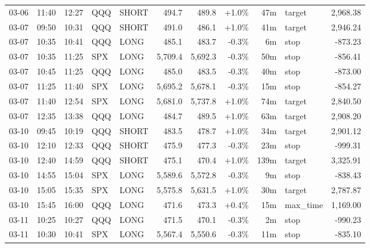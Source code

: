 \documentclass[11pt,a4paper,twoside]{article}
\begin{document}
\begin{center}
\begin{longtable}{>{\color{txtmain}}l l l l l r r r r >{\color{txtmain}}l r}
03-06 & 11:40 & 12:27 & QQQ & SHORT & 494.7 & 489.8 & \textcolor{wingreen}{+1.0\%} & 47m & target & \textcolor{wingreen}{2,968.38} \\
03-07 & 09:50 & 10:31 & QQQ & SHORT & 491.0 & 486.1 & \textcolor{wingreen}{+1.0\%} & 41m & target & \textcolor{wingreen}{2,946.24} \\
03-07 & 10:35 & 10:41 & QQQ & LONG & 485.1 & 483.7 & \textcolor{lossred}{-0.3\%} & 6m & stop & \textcolor{lossred}{-873.23} \\
03-07 & 10:35 & 11:25 & SPX & LONG & 5,709.4 & 5,692.3 & \textcolor{lossred}{-0.3\%} & 50m & stop & \textcolor{lossred}{-856.41} \\
03-07 & 10:45 & 11:25 & QQQ & LONG & 485.0 & 483.5 & \textcolor{lossred}{-0.3\%} & 40m & stop & \textcolor{lossred}{-873.00} \\
03-07 & 11:25 & 11:40 & SPX & LONG & 5,695.2 & 5,678.1 & \textcolor{lossred}{-0.3\%} & 15m & stop & \textcolor{lossred}{-854.27} \\
03-07 & 11:40 & 12:54 & SPX & LONG & 5,681.0 & 5,737.8 & \textcolor{wingreen}{+1.0\%} & 74m & target & \textcolor{wingreen}{2,840.50} \\
03-07 & 12:35 & 13:38 & QQQ & LONG & 484.7 & 489.5 & \textcolor{wingreen}{+1.0\%} & 63m & target & \textcolor{wingreen}{2,908.20} \\
03-10 & 09:45 & 10:19 & QQQ & SHORT & 483.5 & 478.7 & \textcolor{wingreen}{+1.0\%} & 34m & target & \textcolor{wingreen}{2,901.12} \\
03-10 & 12:10 & 12:33 & QQQ & SHORT & 475.9 & 477.3 & \textcolor{lossred}{-0.3\%} & 23m & stop & \textcolor{lossred}{-999.31} \\
03-10 & 12:40 & 14:59 & QQQ & SHORT & 475.1 & 470.4 & \textcolor{wingreen}{+1.0\%} & 139m & target & \textcolor{wingreen}{3,325.91} \\
03-10 & 14:55 & 15:04 & SPX & LONG & 5,589.6 & 5,572.8 & \textcolor{lossred}{-0.3\%} & 9m & stop & \textcolor{lossred}{-838.43} \\
03-10 & 15:05 & 15:35 & SPX & LONG & 5,575.8 & 5,631.5 & \textcolor{wingreen}{+1.0\%} & 30m & target & \textcolor{wingreen}{2,787.87} \\
03-10 & 15:45 & 16:00 & QQQ & LONG & 471.6 & 473.3 & \textcolor{wingreen}{+0.4\%} & 15m & max\_time & \textcolor{wingreen}{1,169.00} \\
03-11 & 10:25 & 10:27 & QQQ & LONG & 471.5 & 470.1 & \textcolor{lossred}{-0.3\%} & 2m & stop & \textcolor{lossred}{-990.23} \\
03-11 & 10:30 & 10:41 & SPX & LONG & 5,567.4 & 5,550.6 & \textcolor{lossred}{-0.3\%} & 11m & stop & \textcolor{lossred}{-835.10} \\

\end{longtable}
\end{center}
\end{document}
